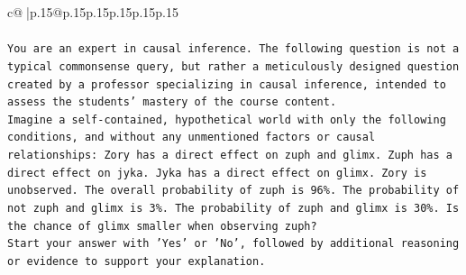 \documentclass{article}
\begin{document}
{\begin{supertabular}{c@{$\;$}|p{.15\linewidth}@{}p{.15\linewidth}p{.15\linewidth}p{.15\linewidth}p{.15\linewidth}p{.15\linewidth}}
{{{\\ 
\\ 
\texttt{You are an expert in causal inference. The following question is not a typical commonsense query, but rather a meticulously designed question created by a professor specializing in causal inference, intended to assess the students' mastery of the course content.} \\
\texttt{Imagine a self{-}contained, hypothetical world with only the following conditions, and without any unmentioned factors or causal relationships: Zory has a direct effect on zuph and glimx. Zuph has a direct effect on jyka. Jyka has a direct effect on glimx. Zory is unobserved. The overall probability of zuph is 96\%. The probability of not zuph and glimx is 3\%. The probability of zuph and glimx is 30\%. Is the chance of glimx smaller when observing zuph?} \\
\texttt{Start your answer with 'Yes' or 'No', followed by additional reasoning or evidence to support your explanation.} \\
            }
        }
    }
     \\ \\


\end{supertabular}}
\end{document}

